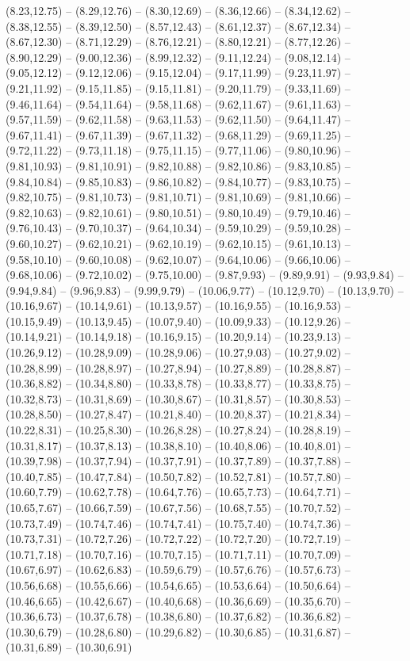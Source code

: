 {(8.23,12.75) -- (8.29,12.76) -- (8.30,12.69) -- (8.36,12.66) -- (8.34,12.62) -- (8.38,12.55) -- (8.39,12.50) -- (8.57,12.43) -- (8.61,12.37) -- (8.67,12.34) -- (8.67,12.30) -- (8.71,12.29) -- (8.76,12.21) -- (8.80,12.21) -- (8.77,12.26) -- (8.90,12.29) -- (9.00,12.36) -- (8.99,12.32) -- (9.11,12.24) -- (9.08,12.14) -- (9.05,12.12) -- (9.12,12.06) -- (9.15,12.04) -- (9.17,11.99) -- (9.23,11.97) -- (9.21,11.92) -- (9.15,11.85) -- (9.15,11.81) -- (9.20,11.79) -- (9.33,11.69) -- (9.46,11.64) -- (9.54,11.64) -- (9.58,11.68) -- (9.62,11.67) -- (9.61,11.63) -- (9.57,11.59) -- (9.62,11.58) -- (9.63,11.53) -- (9.62,11.50) -- (9.64,11.47) -- (9.67,11.41) -- (9.67,11.39) -- (9.67,11.32) -- (9.68,11.29) -- (9.69,11.25) -- (9.72,11.22) -- (9.73,11.18) -- (9.75,11.15) -- (9.77,11.06) -- (9.80,10.96) -- (9.81,10.93) -- (9.81,10.91) -- (9.82,10.88) -- (9.82,10.86) -- (9.83,10.85) -- (9.84,10.84) -- (9.85,10.83) -- (9.86,10.82) -- (9.84,10.77) -- (9.83,10.75) -- (9.82,10.75) -- (9.81,10.73) -- (9.81,10.71) -- (9.81,10.69) -- (9.81,10.66) -- (9.82,10.63) -- (9.82,10.61) -- (9.80,10.51) -- (9.80,10.49) -- (9.79,10.46) -- (9.76,10.43) -- (9.70,10.37) -- (9.64,10.34) -- (9.59,10.29) -- (9.59,10.28) -- (9.60,10.27) -- (9.62,10.21) -- (9.62,10.19) -- (9.62,10.15) -- (9.61,10.13) -- (9.58,10.10) -- (9.60,10.08) -- (9.62,10.07) -- (9.64,10.06) -- (9.66,10.06) -- (9.68,10.06) -- (9.72,10.02) -- (9.75,10.00) -- (9.87,9.93) -- (9.89,9.91) -- (9.93,9.84) -- (9.94,9.84) -- (9.96,9.83) -- (9.99,9.79) -- (10.06,9.77) -- (10.12,9.70) -- (10.13,9.70) -- (10.16,9.67) -- (10.14,9.61) -- (10.13,9.57) -- (10.16,9.55) -- (10.16,9.53) -- (10.15,9.49) -- (10.13,9.45) -- (10.07,9.40) -- (10.09,9.33) -- (10.12,9.26) -- (10.14,9.21) -- (10.14,9.18) -- (10.16,9.15) -- (10.20,9.14) -- (10.23,9.13) -- (10.26,9.12) -- (10.28,9.09) -- (10.28,9.06) -- (10.27,9.03) -- (10.27,9.02) -- (10.28,8.99) -- (10.28,8.97) -- (10.27,8.94) -- (10.27,8.89) -- (10.28,8.87) -- (10.36,8.82) -- (10.34,8.80) -- (10.33,8.78) -- (10.33,8.77) -- (10.33,8.75) -- (10.32,8.73) -- (10.31,8.69) -- (10.30,8.67) -- (10.31,8.57) -- (10.30,8.53) -- (10.28,8.50) -- (10.27,8.47) -- (10.21,8.40) -- (10.20,8.37) -- (10.21,8.34) -- (10.22,8.31) -- (10.25,8.30) -- (10.26,8.28) -- (10.27,8.24) -- (10.28,8.19) -- (10.31,8.17) -- (10.37,8.13) -- (10.38,8.10) -- (10.40,8.06) -- (10.40,8.01) -- (10.39,7.98) -- (10.37,7.94) -- (10.37,7.91) -- (10.37,7.89) -- (10.37,7.88) -- (10.40,7.85) -- (10.47,7.84) -- (10.50,7.82) -- (10.52,7.81) -- (10.57,7.80) -- (10.60,7.79) -- (10.62,7.78) -- (10.64,7.76) -- (10.65,7.73) -- (10.64,7.71) -- (10.65,7.67) -- (10.66,7.59) -- (10.67,7.56) -- (10.68,7.55) -- (10.70,7.52) -- (10.73,7.49) -- (10.74,7.46) -- (10.74,7.41) -- (10.75,7.40) -- (10.74,7.36) -- (10.73,7.31) -- (10.72,7.26) -- (10.72,7.22) -- (10.72,7.20) -- (10.72,7.19) -- (10.71,7.18) -- (10.70,7.16) -- (10.70,7.15) -- (10.71,7.11) -- (10.70,7.09) -- (10.67,6.97) -- (10.62,6.83) -- (10.59,6.79) -- (10.57,6.76) -- (10.57,6.73) -- (10.56,6.68) -- (10.55,6.66) -- (10.54,6.65) -- (10.53,6.64) -- (10.50,6.64) -- (10.46,6.65) -- (10.42,6.67) -- (10.40,6.68) -- (10.36,6.69) -- (10.35,6.70) -- (10.36,6.73) -- (10.37,6.78) -- (10.38,6.80) -- (10.37,6.82) -- (10.36,6.82) -- (10.30,6.79) -- (10.28,6.80) -- (10.29,6.82) -- (10.30,6.85) -- (10.31,6.87) -- (10.31,6.89) -- (10.30,6.91) }
